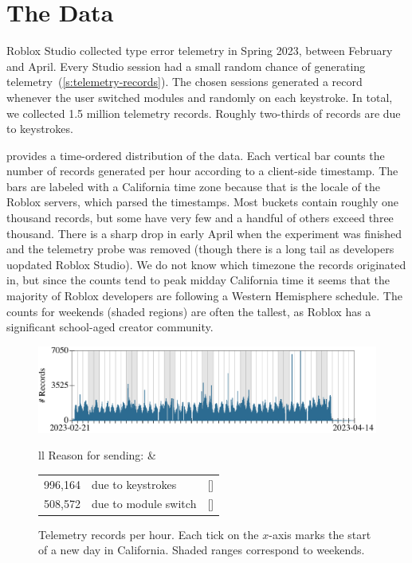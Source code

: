 \documentclass[english,submission,cleveref]{programming}
\begin{document}
\section{The Data}
\label{s:data}

Roblox Studio collected type error telemetry in Spring 2023,
between February and April.
Every Studio session had a small random chance of generating
telemetry~(\cref{s:telemetry-records}).
The chosen sessions generated a record whenever the user switched modules and
randomly on each keystroke.
In total, we collected 1.5 million telemetry records.
Roughly two-thirds of records are due to keystrokes.

 provides a time-ordered distribution of the data.
Each vertical bar counts the number of records generated per hour according to
a client-side timestamp.
The bars are labeled with a California time zone because that is the locale of
the Roblox servers, which parsed the timestamps.
Most buckets contain roughly one thousand records, but some have very few
and a handful of others exceed three thousand.
There is a sharp drop in early April when the experiment was finished
and the telemetry probe was removed (though there is a long tail as
developers uopdated Roblox Studio).
We do not know which timezone the records originated in, but since the counts
tend to peak midday California time it seems that the majority
of Roblox developers are following a Western Hemisphere schedule.
The counts for weekends (shaded regions) are often the tallest,
as Roblox has a significant school-aged creator community.

\begin{figure}[t]\centering
  \includegraphics[width=\columnwidth]{img/row-distribution.pdf}
  \begin{tabular}{ll}
    Reason for sending:
    &
    \begin{tabular}[t]{r@{~~}l@{~~}r}
      996,164 & due to keystrokes  & [\pct{66.20}] \\
      508,572 & due to module switch & [\pct{33.80}]
    \end{tabular}
  \end{tabular}
  \caption{Telemetry records per hour. Each tick on the $x$-axis marks the start of a new day in California. Shaded ranges correspond to weekends.}
  \label{f:records-per-hour}
\end{figure}
\end{document}
